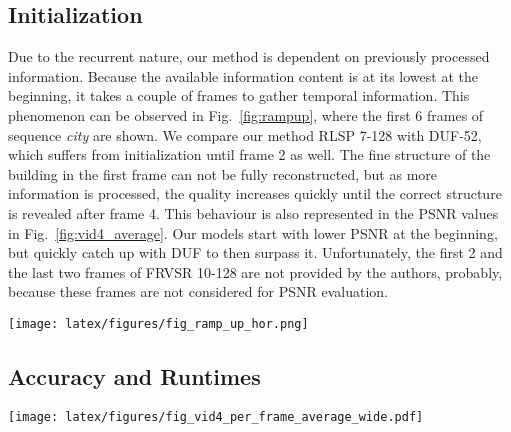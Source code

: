 \documentclass[10pt,twocolumn,letterpaper]{article}
\begin{document}
\subsection{Initialization}

Due to the recurrent nature, our method is dependent on previously processed information. Because the available information content is at its lowest at the beginning, it takes a couple of frames to gather temporal information. This phenomenon can be observed in Fig.~\ref{fig:rampup}, where the first 6 frames of sequence \textit{city} are shown. We compare our method RLSP 7-128 with DUF-52, which suffers from initialization until frame 2 as well.
The fine structure of the building in the first frame can not be fully reconstructed, but as more information is processed, the quality increases quickly until the correct structure is revealed after frame 4. This behaviour is also represented in the PSNR values in Fig.~\ref{fig:vid4_average}. Our models start with lower PSNR at the beginning, but quickly catch up with DUF to then surpass it. Unfortunately, the first 2 and the last two frames of FRVSR 10-128 are not provided by the authors, probably, because these frames are not considered for PSNR evaluation.

\begin{figure*}
\begin{center}
\texttt{[image: latex/figures/fig\_ramp\_up\_hor.png]}
\end{center}
   \caption{Initialization artefacts for DUF-52 and RLSP 7-128. The first 6 frames of \textit{city} are shown. DUF-52 is fully initialized at frame 2, when all input frames  are available. RLSP 7-128 reconstructs the full structure starting from frame 4, while DUF-52 still exhibits artefacts.}
\label{fig:rampup}
\end{figure*}




\subsection{Accuracy and Runtimes}

\begin{figure*}
\begin{center}
\texttt{[image: latex/figures/fig\_vid4\_per\_frame\_average\_wide.pdf]}
\end{center}
\vspace{-0.15cm}
   \caption{Average PSNR values over all 4 videos in Vid4 for the top models of FRVSR~\cite{frvsr}, DUF~\cite{duf} and our models RLSP 7-64 and RLSP 7-128. The full average is calculated for the first 34 frames, constrained by the shortest sequence \textit{city}. The first and last two frames of FRVSR 10-128 are not provided by the authors.}
\label{fig:vid4_average}
\vspace{-0.15cm}
\end{figure*}
\end{document}
